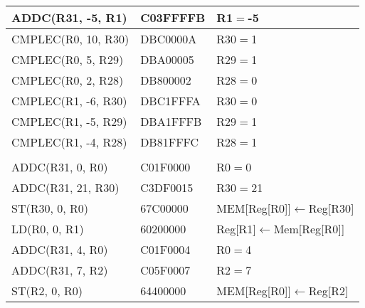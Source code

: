 \documentclass[a4paper, 10pt, oneside]{article}
\begin{document}
\begin{table}[!ht]
\begin{tabular}{|l|l|l|}
ADDC(R31, -5, R1)                          & C03FFFFB                                  & R1$=$-5                              \\ \hline
CMPLEC(R0, 10, R30)                        & DBC0000A                                  & R30$=$1                              \\ \hline
CMPLEC(R0, 5, R29)                         & DBA00005                                  & R29$=$1                              \\ \hline
CMPLEC(R0, 2, R28)                         & DB800002                                  & R28$=$0                              \\ \hline
CMPLEC(R1, -6, R30)                        & DBC1FFFA                                  & R30$=$0                              \\ \hline
CMPLEC(R1, -5, R29)                        & DBA1FFFB                                  & R29$=$1                              \\ \hline
CMPLEC(R1, -4, R28)                        & DB81FFFC                                  & R28$=$1                              \\ \hline
                                           &                                           &                                       \\ \hline
ADDC(R31, 0, R0)                           & C01F0000                                  & R0$=$0                               \\ \hline
ADDC(R31, 21, R30)                         & C3DF0015                                  & R30$=$21                             \\ \hline
ST(R30, 0, R0)                             & 67C00000                                  & MEM[Reg[R0]]$\leftarrow$Reg[R30]\\ \hline
LD(R0, 0, R1)                              & 60200000                                  & Reg[R1]$\leftarrow$Mem[Reg[R0]]\\ \hline
ADDC(R31, 4, R0)                           & C01F0004                                  & R0$=$4                               \\ \hline
ADDC(R31, 7, R2)                           & C05F0007                                  & R2$=$7                               \\ \hline
ST(R2, 0, R0)                              & 64400000                                  & MEM[Reg[R0]]$\leftarrow$Reg[R2]\\ \hline
\end{tabular}
\end{table}
\end{document}
